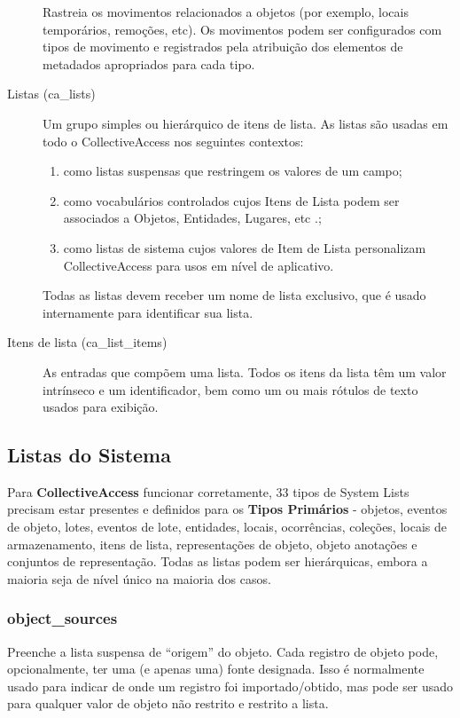 \begin{description}
	Rastreia os movimentos relacionados a objetos (por exemplo, locais temporários, remoções, etc). Os movimentos podem ser configurados com tipos de movimento e registrados pela atribuição dos elementos de metadados apropriados para cada tipo.
	\item[Listas (ca\_lists)] 
	Um grupo simples ou hierárquico de itens de lista. As listas são usadas em todo o CollectiveAccess nos seguintes contextos: 
	\begin{enumerate}
		\item como listas suspensas que restringem os valores de um campo;
		\item como vocabulários controlados cujos Itens de Lista podem ser associados a Objetos, Entidades, Lugares, etc .;
		\item como listas de sistema cujos valores de Item de Lista personalizam CollectiveAccess para usos em nível de aplicativo.
	\end{enumerate} Todas as listas devem receber um nome de lista exclusivo, que é usado internamente para identificar sua lista.
	\item[Itens de lista (ca\_list\_items)] As entradas que compõem uma lista. Todos os itens da lista têm um valor intrínseco e um identificador, bem como um ou mais rótulos de texto usados para exibição.
\end{description}

\subsection{Listas do Sistema}
Para \textbf{CollectiveAccess} funcionar corretamente, 33 tipos de System Lists precisam estar presentes e definidos para os \textbf{Tipos Primários }- objetos, eventos de objeto, lotes, eventos de lote, entidades, locais, ocorrências, coleções, locais de armazenamento, itens de lista, representações de objeto, objeto anotações e conjuntos de representação. Todas as listas podem ser hierárquicas, embora a maioria seja de nível único na maioria dos casos.

\subsubsection{object\_sources}
Preenche a lista suspensa de ``origem'' do objeto. Cada registro de objeto pode, opcionalmente, ter uma (e apenas uma) fonte designada. Isso é normalmente usado para indicar de onde um registro foi importado/obtido, mas pode ser usado para qualquer valor de objeto não restrito e restrito a lista.

